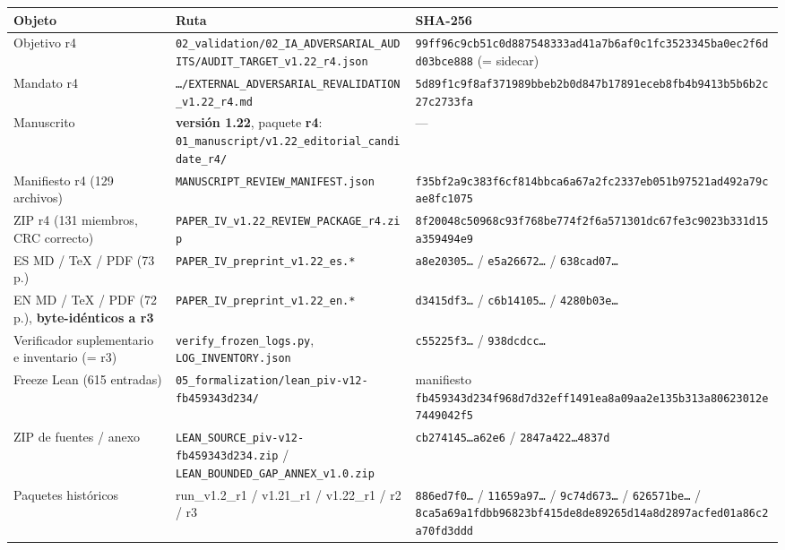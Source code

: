 \documentclass[
]{article}
\newcounter{none} %
\begin{document}
{\def\LTcaptype{none} %
\begin{longtable}[]{@{}lll@{}}
\toprule\noalign{}
Objeto & Ruta & SHA-256 \\
\midrule\noalign{}
\endhead
\bottomrule\noalign{}
\endlastfoot
Objetivo r4 &
\texttt{02\_validation/02\_IA\_ADVERSARIAL\_AUDITS/AUDIT\_TARGET\_v1.22\_r4.json}
&
\texttt{99ff96c9cb51c0d887548333ad41a7b6af0c1fc3523345ba0ec2f6dd03bce888}
(= sidecar) \\
Mandato r4 &
\texttt{…/EXTERNAL\_ADVERSARIAL\_REVALIDATION\_v1.22\_r4.md} &
\texttt{5d89f1c9f8af371989bbeb2b0d847b17891eceb8fb4b9413b5b6b2c27c2733fa} \\
Manuscrito & \textbf{versión 1.22}, paquete \textbf{r4}:
\texttt{01\_manuscript/v1.22\_editorial\_candidate\_r4/} & --- \\
Manifiesto r4 (129 archivos) &
\texttt{MANUSCRIPT\_REVIEW\_MANIFEST.json} &
\texttt{f35bf2a9c383f6cf814bbca6a67a2fc2337eb051b97521ad492a79cae8fc1075} \\
ZIP r4 (131 miembros, CRC correcto) &
\texttt{PAPER\_IV\_v1.22\_REVIEW\_PACKAGE\_r4.zip} &
\texttt{8f20048c50968c93f768be774f2f6a571301dc67fe3c9023b331d15a359494e9} \\
ES MD / TeX / PDF (73 p.) & \texttt{PAPER\_IV\_preprint\_v1.22\_es.*} &
\texttt{a8e20305…} / \texttt{e5a26672…} / \texttt{638cad07…} \\
EN MD / TeX / PDF (72 p.), \textbf{byte-idénticos a r3} &
\texttt{PAPER\_IV\_preprint\_v1.22\_en.*} & \texttt{d3415df3…} /
\texttt{c6b14105…} / \texttt{4280b03e…} \\
Verificador suplementario e inventario (= r3) &
\texttt{verify\_frozen\_logs.py}, \texttt{LOG\_INVENTORY.json} &
\texttt{c55225f3…} / \texttt{938dcdcc…} \\
Freeze Lean (615 entradas) &
\texttt{05\_formalization/lean\_piv-v12-fb459343d234/} & manifiesto
\texttt{fb459343d234f968d7d32eff1491ea8a09aa2e135b313a80623012e7449042f5} \\
ZIP de fuentes / anexo & \texttt{LEAN\_SOURCE\_piv-v12-fb459343d234.zip}
/ \texttt{LEAN\_BOUNDED\_GAP\_ANNEX\_v1.0.zip} & \texttt{cb274145…a62e6}
/ \texttt{2847a422…4837d} \\
Paquetes históricos & run\_v1.2\_r1 / v1.21\_r1 / v1.22\_r1 / r2 / r3 &
\texttt{886ed7f0…} / \texttt{11659a97…} / \texttt{9c74d673…} /
\texttt{626571be…} /
\texttt{8ca5a69a1fdbb96823bf415de8de89265d14a8d2897acfed01a86c2a70fd3ddd} \\
\end{longtable}
}
\end{document}
